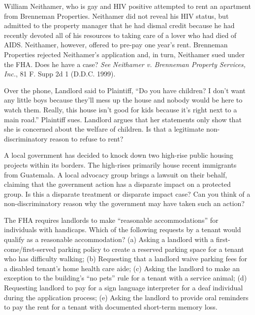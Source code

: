 
\item William Neithamer, who is gay and HIV positive attempted to rent an
apartment from Brenneman Properties.  Neithamer did not reveal his HIV status,
but admitted to the property manager that he had dismal credit because he had
recently devoted all of his resources to taking care of a lover who had died of
AIDS.  Neithamer, however, offered to pre-pay one year's rent.  Brenneman
Properties rejected Neithamer's application and, in turn, Neithamer sued under
the FHA.  Does he have a case?  \textit{See} \textit{Neithamer v. Brenneman
Property Services, Inc.}, 81 F. Supp 2d 1 (D.D.C. 1999).  


\item Over the phone, Landlord said to Plaintiff, ``Do you have children? I
don't want any little boys because they'll mess up the house and nobody would
be here to watch them.  Really, this house isn't good for kids because it's
right next to a main road.''  Plaintiff sues. Landlord argues that her
statements only show that she is concerned about the welfare of children.  Is
that a legitimate non-discriminatory reason to refuse to rent?  


\item A local government has decided to knock down two high-rise public housing
projects within its borders.  The high-rises primarily house recent immigrants
from Guatemala.  A local advocacy group brings a lawsuit on their behalf,
claiming that the government action has a disparate impact on a protected
group.  Is this a disparate treatment or disparate impact case? Can you think
of a non-discriminatory reason why the government may have taken such an
action?


\item The FHA requires landlords to make ``reasonable accommodations'' for
individuals with handicaps.  Which of the following requests by a tenant would
qualify as a reasonable accommodation? (a) Asking a landlord with a
first-come/first-served parking policy to create a reserved parking space for a
tenant who has difficulty walking; (b) Requesting that a landlord waive parking
fees for a disabled tenant's home health care aide; (c) Asking the landlord to
make an exception to the building's ``no pets'' rule for a tenant with a
service animal; (d) Requesting landlord to pay for a sign language interpreter
for a deaf individual during the application process; (e) Asking the landlord
to provide oral reminders to pay the rent for a tenant with documented
short-term memory loss. 

